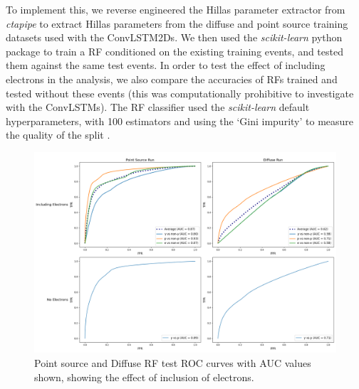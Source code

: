 To implement this, we reverse engineered the Hillas parameter extractor from \textit{ctapipe} to extract Hillas parameters from the diffuse and point source training datasets used with the ConvLSTM2Ds. We then used the \textit{scikit-learn} python package to train a RF conditioned on the existing training events, and tested them against the same test events. In order to test the effect of including electrons in the analysis, we also compare the accuracies of RFs trained and tested without these events (this was computationally prohibitive to investigate with the ConvLSTMs). The RF classifier used the \textit{scikit-learn} default hyperparameters, with 100 estimators and using the `Gini impurity' to measure the quality of the split \cite{scikit}.

\begin{figure}[ht] 
        \centering \includegraphics[width=\columnwidth]{figures/rfplot.png}

        \caption{
                \label{fig:rfplot} %
                Point source and Diffuse RF test ROC curves with AUC values shown, showing the effect of inclusion of electrons.
        }
\end{figure}

